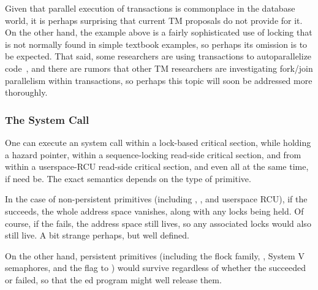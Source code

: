 Given that parallel execution of transactions is commonplace in the
database world, it is perhaps surprising that current TM proposals do
not provide for it.
On the other hand, the example above is a fairly sophisticated use
of locking that is not normally found in simple textbook examples,
so perhaps its omission is to be expected.
That said, some researchers are using transactions to autoparallelize
code~\cite{ArunRaman2010MultithreadedTransactions},
and there are rumors that other TM researchers are investigating
fork/join parallelism within transactions, so perhaps this topic will
soon be addressed more thoroughly.

\subsubsection{The  System Call}
\label{sec:future:The exec System Call}

One can execute an  system call within a lock-based critical
section, while holding a hazard pointer, within a sequence-locking
read-side critical section, and from within a userspace-RCU read-side
critical section, and even all at the same time, if need be.
The exact semantics depends on the type of primitive.

In the case of non-persistent primitives (including
, , and userspace RCU),
if the  succeeds, the whole address space vanishes, along
with any locks being held.
Of course, if the  fails, the address space still lives,
so any associated locks would also still live.
A bit strange perhaps, but well defined.

On the other hand, persistent primitives (including the flock family,
, System V semaphores, and the  flag to
) would survive regardless of whether the 
succeeded or failed, so that the ed program might well
release them.

\QuickQuizEnd

